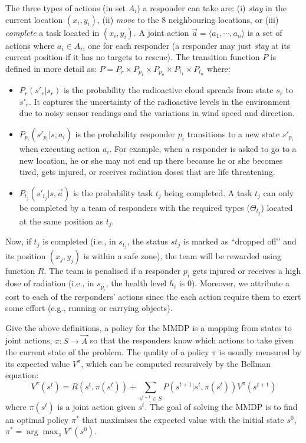 The three types of actions  (in set $A_i$) a responder can take
are: (i) {\em stay} in the current location $(x_i, y_i)$, (ii) {\em
move} to the 8 neighbouring locations, or (iii) {\em complete} a
task located in $(x_i, y_i)$. A joint action $\vec{a}=\langle a_1,
\cdots, a_n \rangle$ is a set of actions where $a_i\in A_i$, one
for each responder (a responder may just \emph{stay} at its current position if it has no targets to rescue). The transition function $P$ is defined in more detail as: $P= P_r
\times P_{p_1} \times P_{p_n} \times P_{t_1} \times P_{t_n}$ where:
\begin{itemize}
    \itemsep=-2pt
    \item $P_r(s'_r|s_r)$ is the probability the
        radioactive cloud spreads from state $s_r$ to $s'_r$.
        It captures the uncertainty of the  radioactive
        levels in the environment due to  noisy sensor
        readings and the variations in wind speed and direction.
    \item $P_{p_i}(s'_{p_i}|s, a_i)$ is the probability
        responder $p_i$ transitions to a new state $s'_{p_i}$
        when executing action $a_i$. For example, when a
        responder is asked to go to a new location, he or she
        may not end up there because he or she becomes tired, gets
        injured, or receives radiation doses that are life
        threatening.
    \item $P_{t_j}(s'_{t_j}|s, \vec{a})$ is the probability
        task $t_j$ being completed. A task $t_j$ can only be completed by a
        team of responders with the required types ($\Theta_{t_j}$) located at the
        same position as $t_j$.
\end{itemize}

Now,  if  $t_j$ is completed (i.e., in $s_{t_j}$, the status
$st_j$ is marked as ``dropped off'' and its position $(x_j, y_j)$
is within a safe zone), the team will be rewarded using
function $R$. The team is penalised if a responder
$p_i$ gets injured or receives a high dose of radiation (i.e., in
$s_{p_i}$, the health level $h_i$ is 0). Moreover, we attribute a
cost to each of the responders' actions since the each  action require them to
exert some effort (e.g., running or carrying objects).


Give the above definitions, a policy for the MMDP is a mapping from
states to joint actions, $\pi: S \rightarrow \vec{A}$ so that the
responders know which actions to take given the current state of
the problem. The quality of a policy $\pi$ is usually measured by
its expected value $V^\pi$, which can be computed recursively by
the Bellman equation:
\begin{equation}
  V^\pi(s^t) = R(s^t, \pi(s^t)) + \!\!\!\sum_{s^{t+1}\in S}\!\!\!
  P(s^{t+1}|s^t, \pi(s^t)) V^\pi(s^{t+1})
\end{equation}
where $\pi(s^t)$ is a joint action given $s^t$. The goal of solving
the MMDP is to find an optimal policy $\pi^*$ that maximises the
expected value with the initial state $s^0$, $\pi^* =
\arg\max_{\pi} V^\pi(s^0)$.

